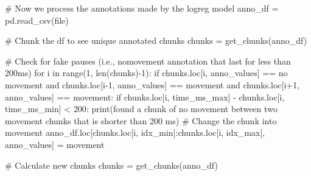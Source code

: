 \documentclass[
  letterpaper,
  DIV=11,
  numbers=noendperiod]{scrreprt}
\newenvironment{Shaded}{\begin{snugshade}}{\end{snugshade}}
\newcommand{\BuiltInTok}[1]{\textcolor[rgb]{0.00,0.23,0.31}{#1}}
\newcommand{\CommentTok}[1]{\textcolor[rgb]{0.37,0.37,0.37}{#1}}
\newcommand{\ControlFlowTok}[1]{\textcolor[rgb]{0.00,0.23,0.31}{#1}}
\newcommand{\DecValTok}[1]{\textcolor[rgb]{0.68,0.00,0.00}{#1}}
\newcommand{\KeywordTok}[1]{\textcolor[rgb]{0.00,0.23,0.31}{#1}}
\newcommand{\NormalTok}[1]{\textcolor[rgb]{0.00,0.23,0.31}{#1}}
\newcommand{\OperatorTok}[1]{\textcolor[rgb]{0.37,0.37,0.37}{#1}}
\newcommand{\StringTok}[1]{\textcolor[rgb]{0.13,0.47,0.30}{#1}}
\begin{document}
\begin{Shaded}
\begin{Highlighting}[]
        \CommentTok{\# Now we process the annotations made by the logreg model}
\NormalTok{        anno\_df }\OperatorTok{=}\NormalTok{ pd.read\_csv(}\BuiltInTok{file}\NormalTok{)}

        \CommentTok{\# Chunk the df to see unique annotated chunks}
\NormalTok{        chunks }\OperatorTok{=}\NormalTok{ get\_chunks(anno\_df)}

        \CommentTok{\# Check for fake pauses (i.e., nomovement annotation that last for less than 200ms)}
        \ControlFlowTok{for}\NormalTok{ i }\KeywordTok{in} \BuiltInTok{range}\NormalTok{(}\DecValTok{1}\NormalTok{, }\BuiltInTok{len}\NormalTok{(chunks)}\OperatorTok{{-}}\DecValTok{1}\NormalTok{):}
            \ControlFlowTok{if}\NormalTok{ chunks.loc[i, }\StringTok{\textquotesingle{}anno\_values\textquotesingle{}}\NormalTok{] }\OperatorTok{==} \StringTok{\textquotesingle{}no movement\textquotesingle{}} \KeywordTok{and}\NormalTok{ chunks.loc[i}\OperatorTok{{-}}\DecValTok{1}\NormalTok{, }\StringTok{\textquotesingle{}anno\_values\textquotesingle{}}\NormalTok{] }\OperatorTok{==} \StringTok{\textquotesingle{}movement\textquotesingle{}} \KeywordTok{and}\NormalTok{ chunks.loc[i}\OperatorTok{+}\DecValTok{1}\NormalTok{, }\StringTok{\textquotesingle{}anno\_values\textquotesingle{}}\NormalTok{] }\OperatorTok{==} \StringTok{\textquotesingle{}movement\textquotesingle{}}\NormalTok{:}
                \ControlFlowTok{if}\NormalTok{ chunks.loc[i, }\StringTok{\textquotesingle{}time\_ms\_max\textquotesingle{}}\NormalTok{] }\OperatorTok{{-}}\NormalTok{ chunks.loc[i, }\StringTok{\textquotesingle{}time\_ms\_min\textquotesingle{}}\NormalTok{] }\OperatorTok{\textless{}} \DecValTok{200}\NormalTok{:}
                    \BuiltInTok{print}\NormalTok{(}\StringTok{\textquotesingle{}found a chunk of no movement between two movement chunks that is shorter than 200 ms\textquotesingle{}}\NormalTok{)}
                    \CommentTok{\# Change the chunk into movement}
\NormalTok{                    anno\_df.loc[chunks.loc[i, }\StringTok{\textquotesingle{}idx\_min\textquotesingle{}}\NormalTok{]:chunks.loc[i, }\StringTok{\textquotesingle{}idx\_max\textquotesingle{}}\NormalTok{], }\StringTok{\textquotesingle{}anno\_values\textquotesingle{}}\NormalTok{] }\OperatorTok{=} \StringTok{\textquotesingle{}movement\textquotesingle{}}

        \CommentTok{\# Calculate new chunks}
\NormalTok{        chunks }\OperatorTok{=}\NormalTok{ get\_chunks(anno\_df)}


\end{Highlighting}
\end{Shaded}
\end{document}
